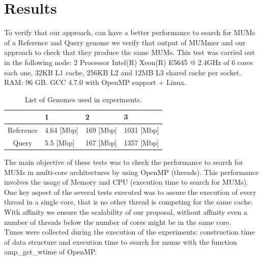 \documentclass{acm_proc_article-sp}
\begin{document}
\section{Results}
To verify that our approach, can have a better performance to search for MUMs of a Reference and Query genome we verify that output of MUMmer and our approach to check that they produce the same MUMs. This test was carried out in the following node: 2 Processor Intel(R) Xeon(R) E5645 @ 2.4GHz of 6 cores each one, 32KB L1 cache, 256KB L2 and 12MB L3 shared cache per socket. RAM: 96 GB. GCC 4.7.0 with OpenMP support + Linux. 
\begin{table}
\centering
\caption{List of Genomes used in experiments.}
\label{genomes}
\begin{tabular}{|c|l|l|l|} \hline
  & 1 & 2 & 3 \\ \hline
  Reference & 4.64 [Mbp] & 169 [Mbp] & 1031 [Mbp] \\ \hline
  Query & 5.5 [Mbp] & 167 [Mbp] & 1357 [Mbp] \\ 
  \hline
\end{tabular}
\end{table}
The main objective of these tests was to check the performance to search for MUMs in multi-core architectures by using OpenMP (threads). This performance involves the usage of Memory and CPU (execution time to search for MUMs).\\
One key aspect of the several tests executed was to assure the execution of every thread in a single core, that is no other thread is competing for the same cache. With affinity we ensure the scalability of our proposal, without affinity even a number of threads below the number of cores might be in the same core. \\
Times were collected during the execution of the experiments: construction time of data structure and execution time to search for mums with the function omp\_get\_wtime of OpenMP.\\
\end{document}
